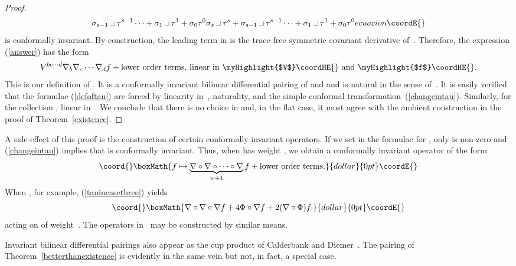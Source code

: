 \documentclass[a4paper,12pt]{amsart}
\providecommand{\intprod}{\makebox[10pt]{\rule{5pt}{.3pt}\rule{.3pt}{5pt}}}
\begin{document}
\begin{proof}
\begin{equation}
{\sigma_{s-1}\intprod\tau^{s-1}\cdots+\sigma_1\intprod\tau^1+\sigma_0\tau^0
}{\sigma_s\intprod\tau^s+
\sigma_{s-1}\intprod\tau^{s-1}\cdots+\sigma_1\intprod\tau^1+\sigma_0\tau^0
}{ecuacion}\coordE{}\end{equation}
is conformally invariant. By construction, the leading term in \coordHE{} is
the \coordHE{} trace-free symmetric covariant derivative of~\coordHE{}.
Therefore, the expression (\ref{answer}) has the form
$$V^{bc\cdots d}\nabla_b\nabla_c\cdots\nabla_df+\mbox{lower order terms, linear
in \myHighlight{$V$}\coordHE{} and \myHighlight{$f$}\coordHE{}}.$$
This is our definition of \coordHE{}. It is a conformally invariant
bilinear differential pairing of \coordHE{} and \coordHE{} and is natural in the sense
of~\cite{kms}. It is easily verified that the formulae (\ref{defoftau})
are forced by linearity in~\coordHE{}, naturality, and the simple conformal
transformation~(\ref{changeintau}). Similarly, for the collection
\coordHE{}, linear in~\coordHE{}. We conclude that there is no choice
in \coordHE{} and, in the flat case, it must agree with the ambient
construction in the proof of Theorem~\ref{existence}.
\end{proof}\renewcommand{\proofname}{Proof}

A side-effect of this proof is the construction of certain
conformally invariant operators. If we set \coordHE{} in the formulae for
\coordHE{}, only \coordHE{} is non-zero and (\ref{changeintau}) implies that
\coordHE{} is conformally invariant. Thus, when \coordHE{} has weight
\coordHE{}, we obtain a conformally invariant operator of the
form
$$\coord{}\boxMath{f\mapsto\underbrace{\nabla\circ\nabla\circ\cdots\circ\nabla}_{w+1}f
  +\mbox{lower order terms}.}{dollar}{0pt}\coordE{}$$
When \coordHE{}, for example, (\ref{tauincasethree}) yields
$$\coord{}\boxMath{\nabla\circ\nabla\circ\nabla f+4\Phi\circ\nabla f+2(\nabla\circ\Phi)f.}{dollar}{0pt}\coordE{}$$
acting on \coordHE{} of weight~\coordHE{}. The operators in~\cite{dnw} may be constructed by
similar means.

Invariant bilinear differential pairings also appear as the cup product of
Calderbank and Diemer~\cite{cd}. The pairing \coordHE{}
of Theorem~\ref{betterthanexistence} is evidently in the same vein but not, in
fact, a special case.
\end{document}
